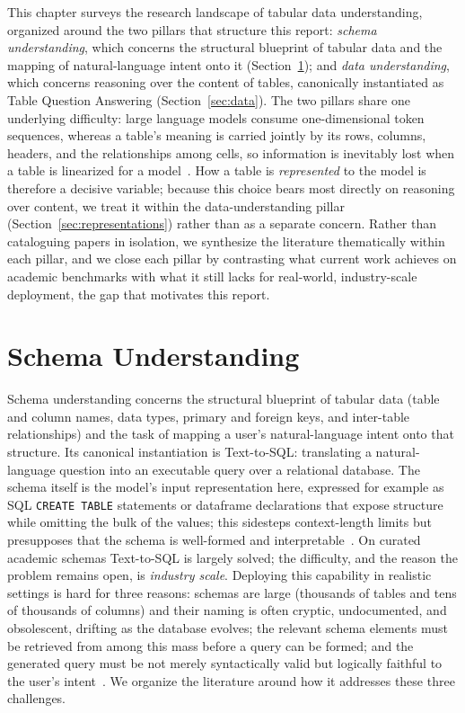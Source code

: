 This chapter surveys the research landscape of tabular data understanding, organized around the two pillars that structure this report: \emph{schema understanding}, which concerns the structural blueprint of tabular data and the mapping of natural-language intent onto it (Section~\ref{sec:schema}); and \emph{data understanding}, which concerns reasoning over the content of tables, canonically instantiated as Table Question Answering (Section~\ref{sec:data}). The two pillars share one underlying difficulty: large language models consume one-dimensional token sequences, whereas a table's meaning is carried jointly by its rows, columns, headers, and the relationships among cells, so information is inevitably lost when a table is linearized for a model~\cite{wu2025tabular}. How a table is \emph{represented} to the model is therefore a decisive variable; because this choice bears most directly on reasoning over content, we treat it within the data-understanding pillar (Section~\ref{sec:representations}) rather than as a separate concern. Rather than cataloguing papers in isolation, we synthesize the literature thematically within each pillar, and we close each pillar by contrasting what current work achieves on academic benchmarks with what it still lacks for real-world, industry-scale deployment, the gap that motivates this report.

\section{Schema Understanding}
\label{sec:schema}
Schema understanding concerns the structural blueprint of tabular data (table and column names, data types, primary and foreign keys, and inter-table relationships) and the task of mapping a user's natural-language intent onto that structure. Its canonical instantiation is Text-to-SQL: translating a natural-language question into an executable query over a relational database. The schema itself is the model's input representation here, expressed for example as SQL \texttt{CREATE TABLE} statements or dataframe declarations that expose structure while omitting the bulk of the values; this sidesteps context-length limits but presupposes that the schema is well-formed and interpretable~\cite{wu2025tabular,sui2024table}. On curated academic schemas Text-to-SQL is largely solved; the difficulty, and the reason the problem remains open, is \emph{industry scale}. Deploying this capability in realistic settings is hard for three reasons: schemas are large (thousands of tables and tens of thousands of columns) and their naming is often cryptic, undocumented, and obsolescent, drifting as the database evolves; the relevant schema elements must be retrieved from among this mass before a query can be formed; and the generated query must be not merely syntactically valid but logically faithful to the user's intent~\cite{li2023bird}. We organize the literature around how it addresses these three challenges.

